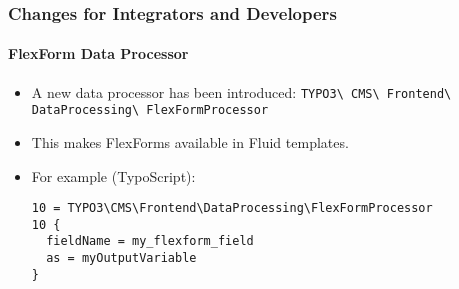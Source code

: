 %

\begin{frame}[fragile]
	\frametitle{Changes for Integrators and Developers}
	\framesubtitle{FlexForm Data Processor}


	\begin{itemize}
		\item A new data processor has been introduced:\newline
			\small\texttt{TYPO3\textbackslash
				CMS\textbackslash
				Frontend\textbackslash
				DataProcessing\textbackslash
				FlexFormProcessor}\normalsize
		\item This makes FlexForms available in Fluid templates.
		\item For example (TypoScript):
\begin{lstlisting}
10 = TYPO3\CMS\Frontend\DataProcessing\FlexFormProcessor
10 {
  fieldName = my_flexform_field
  as = myOutputVariable
}
\end{lstlisting}

	\end{itemize}

\end{frame}

